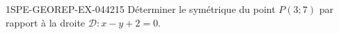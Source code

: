 \begin{exercice}{1SPE-GEOREP-EX-044}{2}{15}
Déterminer le symétrique du point $P(3 ; 7)$ par rapport à la droite $\mathcal{D} : x - y + 2 = 0$.
\end{exercice}
